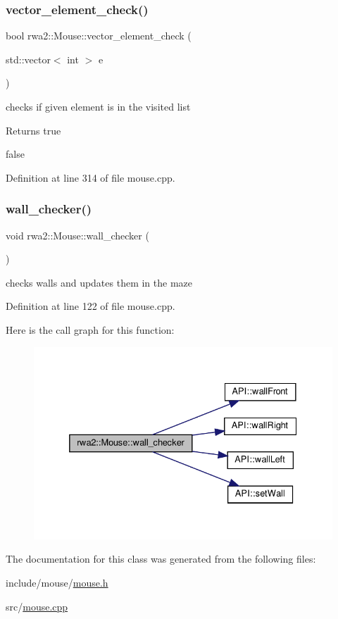 \subsubsection{\texorpdfstring{vector\+\_\+element\+\_\+check()}{vector\_element\_check()}}
{\footnotesize\ttfamily bool rwa2\+::\+Mouse\+::vector\+\_\+element\+\_\+check (\begin{DoxyParamCaption}\item[{std\+::vector$<$ int $>$}]{e }\end{DoxyParamCaption})}



checks if given element is in the visited list 

\begin{DoxyReturn}{Returns}
true 

false 
\end{DoxyReturn}


Definition at line 314 of file mouse.\+cpp.

\mbox{\label{classrwa2_1_1_mouse_a0ee088e89bdbb609091679ca66f98d37}} 
\subsubsection{\texorpdfstring{wall\+\_\+checker()}{wall\_checker()}}
{\footnotesize\ttfamily void rwa2\+::\+Mouse\+::wall\+\_\+checker (\begin{DoxyParamCaption}{ }\end{DoxyParamCaption})}



checks walls and updates them in the maze 



Definition at line 122 of file mouse.\+cpp.

Here is the call graph for this function\+:
\nopagebreak
\begin{figure}[H]
\begin{center}
\leavevmode
\includegraphics[width=332pt]{classrwa2_1_1_mouse_a0ee088e89bdbb609091679ca66f98d37_cgraph}
\end{center}
\end{figure}


The documentation for this class was generated from the following files\+:\begin{DoxyCompactItemize}
\item 
include/mouse/\hyperlink{mouse_8h}{mouse.\+h}\item 
src/\hyperlink{mouse_8cpp}{mouse.\+cpp}\end{DoxyCompactItemize}
